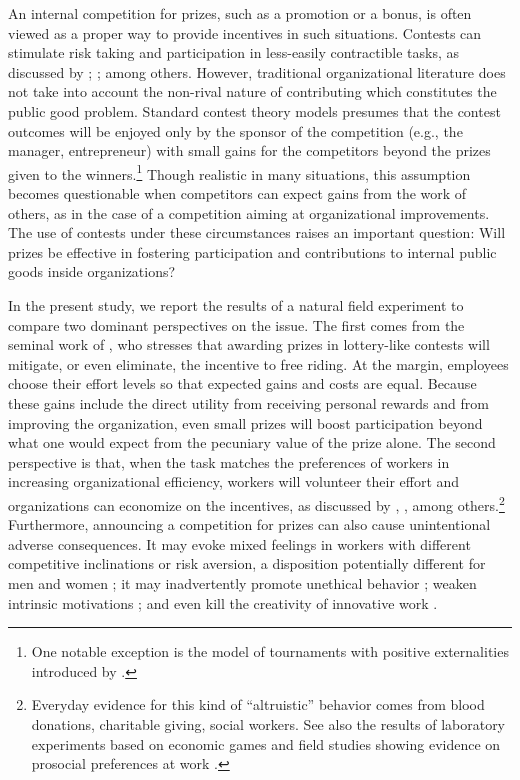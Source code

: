 \documentclass[11pt, titlepage]{article}
\begin{document}
An internal competition for prizes, such as a promotion or a bonus, is
often viewed as a proper way to provide incentives in such situations.
Contests can stimulate risk taking and participation in less-easily
contractible tasks, as discussed by \citet{lazear1981rank};
\citet{green1983comparison}; \citet{mary1984economic} among others.
However, traditional organizational literature does not take into
account the non-rival nature of contributing which constitutes the
public good problem. Standard contest theory models presumes that the
contest outcomes will be enjoyed only by the sponsor of the competition
(e.g., the manager, entrepreneur) with small gains for the competitors
beyond the prizes given to the winners.\footnote{One notable exception
  is the model of tournaments with positive externalities introduced by
  \citet{drago1988incentive}.} Though realistic in many situations, this
assumption becomes questionable when competitors can expect gains from
the work of others, as in the case of a competition aiming at
organizational improvements. The use of contests under these
circumstances raises an important question: Will prizes be effective in
fostering participation and contributions to internal public goods
inside organizations?

In the present study, we report the results of a natural field
experiment to compare two dominant perspectives on the issue. The first
comes from the seminal work of \citet{morgan2000financing}, who stresses
that awarding prizes in lottery-like contests will mitigate, or even
eliminate, the incentive to free riding. At the margin, employees choose
their effort levels so that expected gains and costs are equal. Because
these gains include the direct utility from receiving personal rewards
and from improving the organization, even small prizes will boost
participation beyond what one would expect from the pecuniary value of
the prize alone. The second perspective is that, when the task matches
the preferences of workers in increasing organizational efficiency,
workers will volunteer their effort and organizations can economize on
the incentives, as discussed by \citet{besley2005competition},
\citet{prendergast2007motivation}, \citet{delfgaauw2008incentives} among
others.\footnote{Everyday evidence for this kind of ``altruistic''
  behavior comes from blood donations, charitable giving, social
  workers. See also the results of laboratory experiments based on
  economic games \citep[see][]{levitt2007laboratory} and field studies
  showing evidence on prosocial preferences at work
  \citep{bandiera2005social, dellavigna2016estimating}.} Furthermore,
announcing a competition for prizes can also cause unintentional adverse
consequences. It may evoke mixed feelings in workers with different
competitive inclinations or risk aversion, a disposition potentially
different for men and women \citep{niederle2007women, croson2009gender};
it may inadvertently promote unethical behavior
\citep{lazear1989pay, charness2013dark}; weaken intrinsic motivations
\citep{reeve1996elements, frey1997not}; and even kill the creativity of
innovative work \citep{erat2015incentives}.
\end{document}
